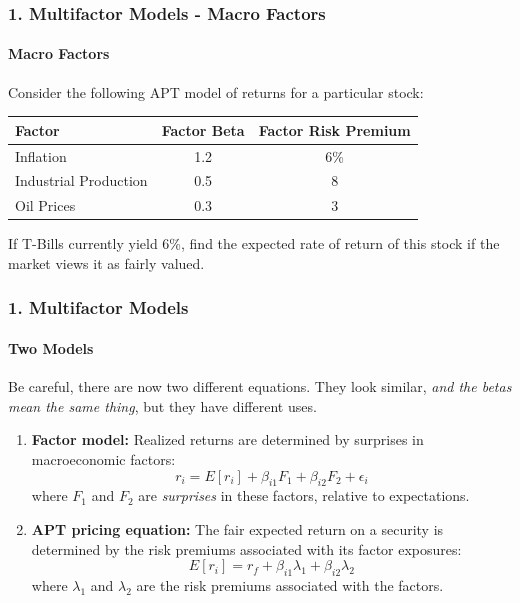 \documentclass{beamer}
\begin{document}
\begin{practiceframe}[t]
    \frametitle{1. Multifactor Models - Macro Factors}
    \framesubtitle{Macro Factors}

    Consider the following APT model of returns for a particular stock:
        \begin{table}
            \begin{tabular}{lcc}
                \toprule
                Factor & Factor Beta & Factor Risk Premium \\
                \midrule
                Inflation   & 1.2 & 6\%\\
                Industrial Production & 0.5 & 8\\
                Oil Prices & 0.3 & 3\\
                \bottomrule
            \end{tabular}
        \end{table}
    If T-Bills currently yield 6\%, find the expected rate of return of this stock if the market 
    views it as fairly valued.\\
    \vspace{1em}
    

\end{practiceframe}

\begin{frame}[t]
    \frametitle{1. Multifactor Models}
    \framesubtitle{Two Models}

    Be careful, there are now two different equations. They look similar, \textit{and the betas mean the same thing}, but they have different uses.
    \begin{enumerate}
        \item \textbf{Factor model:} Realized returns are determined by surprises in macroeconomic factors:
        \[
            r_i = E[r_i] + \beta_{i1}F_1 + \beta_{i2}F_2 + \epsilon_i
        \]
        where $F_1$ and $F_2$ are \textit{surprises} in these factors, relative to expectations.
    
        \item \textbf{APT pricing equation:} The fair expected return on a security is determined by the risk premiums associated with its factor exposures:
        \[
            E[r_i] = r_f + \beta_{i1}\lambda_1 + \beta_{i2}\lambda_2
        \]
        where $\lambda_1$ and $\lambda_2$ are the risk premiums associated with the factors.
    \end{enumerate}

\end{frame}
\end{document}
